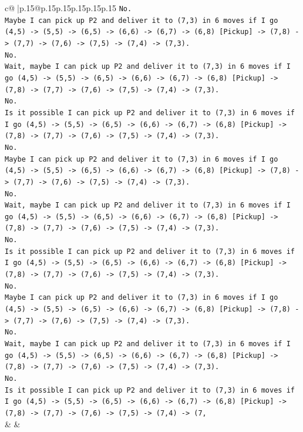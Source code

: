 \documentclass{article}
\begin{document}
{\begin{supertabular}{c@{$\;$}|p{.15\linewidth}@{}p{.15\linewidth}p{.15\linewidth}p{.15\linewidth}p{.15\linewidth}p{.15\linewidth}}
{{{\texttt{No.} \\
\texttt{Maybe I can pick up P2 and deliver it to (7,3) in 6 moves if I go (4,5) {-}> (5,5) {-}> (6,5) {-}> (6,6) {-}> (6,7) {-}> (6,8) {[}Pickup{]} {-}> (7,8) {-}> (7,7) {-}> (7,6) {-}> (7,5) {-}> (7,4) {-}> (7,3).} \\
\texttt{No.} \\
\texttt{Wait, maybe I can pick up P2 and deliver it to (7,3) in 6 moves if I go (4,5) {-}> (5,5) {-}> (6,5) {-}> (6,6) {-}> (6,7) {-}> (6,8) {[}Pickup{]} {-}> (7,8) {-}> (7,7) {-}> (7,6) {-}> (7,5) {-}> (7,4) {-}> (7,3).} \\
\texttt{No.} \\
\texttt{Is it possible I can pick up P2 and deliver it to (7,3) in 6 moves if I go (4,5) {-}> (5,5) {-}> (6,5) {-}> (6,6) {-}> (6,7) {-}> (6,8) {[}Pickup{]} {-}> (7,8) {-}> (7,7) {-}> (7,6) {-}> (7,5) {-}> (7,4) {-}> (7,3).} \\
\texttt{No.} \\
\texttt{Maybe I can pick up P2 and deliver it to (7,3) in 6 moves if I go (4,5) {-}> (5,5) {-}> (6,5) {-}> (6,6) {-}> (6,7) {-}> (6,8) {[}Pickup{]} {-}> (7,8) {-}> (7,7) {-}> (7,6) {-}> (7,5) {-}> (7,4) {-}> (7,3).} \\
\texttt{No.} \\
\texttt{Wait, maybe I can pick up P2 and deliver it to (7,3) in 6 moves if I go (4,5) {-}> (5,5) {-}> (6,5) {-}> (6,6) {-}> (6,7) {-}> (6,8) {[}Pickup{]} {-}> (7,8) {-}> (7,7) {-}> (7,6) {-}> (7,5) {-}> (7,4) {-}> (7,3).} \\
\texttt{No.} \\
\texttt{Is it possible I can pick up P2 and deliver it to (7,3) in 6 moves if I go (4,5) {-}> (5,5) {-}> (6,5) {-}> (6,6) {-}> (6,7) {-}> (6,8) {[}Pickup{]} {-}> (7,8) {-}> (7,7) {-}> (7,6) {-}> (7,5) {-}> (7,4) {-}> (7,3).} \\
\texttt{No.} \\
\texttt{Maybe I can pick up P2 and deliver it to (7,3) in 6 moves if I go (4,5) {-}> (5,5) {-}> (6,5) {-}> (6,6) {-}> (6,7) {-}> (6,8) {[}Pickup{]} {-}> (7,8) {-}> (7,7) {-}> (7,6) {-}> (7,5) {-}> (7,4) {-}> (7,3).} \\
\texttt{No.} \\
\texttt{Wait, maybe I can pick up P2 and deliver it to (7,3) in 6 moves if I go (4,5) {-}> (5,5) {-}> (6,5) {-}> (6,6) {-}> (6,7) {-}> (6,8) {[}Pickup{]} {-}> (7,8) {-}> (7,7) {-}> (7,6) {-}> (7,5) {-}> (7,4) {-}> (7,3).} \\
\texttt{No.} \\
\texttt{Is it possible I can pick up P2 and deliver it to (7,3) in 6 moves if I go (4,5) {-}> (5,5) {-}> (6,5) {-}> (6,6) {-}> (6,7) {-}> (6,8) {[}Pickup{]} {-}> (7,8) {-}> (7,7) {-}> (7,6) {-}> (7,5) {-}> (7,4) {-}> (7,} \\
            }
        }
    }
    & & \\ \\


\end{supertabular}}
\end{document}
